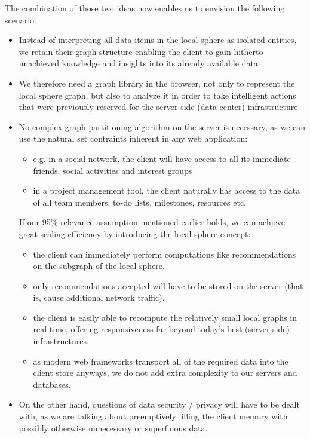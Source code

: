 		The combination of those two ideas now enables us to envision the following scenario:
		
		\begin{itemize}
			\item Instead of interpreting all data items in the local sphere as isolated entities, we retain their graph structure enabling the client to gain hitherto unachieved knowledge and insights into its already available data.
			\item We therefore need a graph library in the browser, not only to represent the local sphere graph, but also to analyze it in order to take intelligent actions that were previously reserved for the server-side (data center) infrastructure.
			\item No complex graph partitioning algorithm on the server is necessary, as we can use the natural set contraints inherent in any web application:
			\begin{itemize}
				\item e.g. in a social network, the client will have access to all its immediate friends, social activities and interest groups
				\item in a project management tool, the client naturally has access to the data of all team members, to-do lists, milestones, resources etc.
			\end{itemize}
			If our 95\%-relevance assumption mentioned earlier holds, we can achieve great scaling efficiency by introducing the local sphere concept:
			\begin{itemize}
				\item the client can immediately perform computations like recommendations on the subgraph of the local sphere.
				\item only recommendations accepted will have to be stored on the server (that is, cause additional network traffic).
				\item the client is easily able to recompute the relatively small local graphs in real-time, offering responsiveness far beyond today's best (server-side) infrastructures.
				\item as modern web frameworks transport all of the required data into the client store anyways, we do not add extra complexity to our servers and databases.
			\end{itemize}
			\item On the other hand, questions of data security / privacy will have to be dealt with, as we are talking about preemptively filling the client memory with possibly otherwise unnecessary or superfluous data.
		\end{itemize}
		
